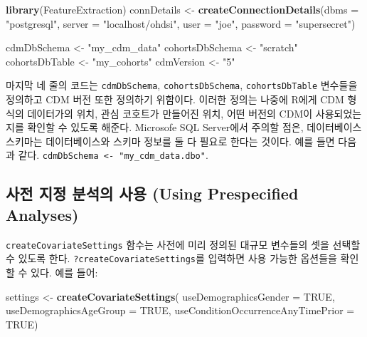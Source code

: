 \documentclass[11pt]{book}
\newenvironment{Shaded}{\begin{snugshade}}{\end{snugshade}}
\newcommand{\KeywordTok}[1]{\textcolor[rgb]{0.13,0.29,0.53}{\textbf{#1}}}
\newcommand{\DataTypeTok}[1]{\textcolor[rgb]{0.13,0.29,0.53}{#1}}
\newcommand{\StringTok}[1]{\textcolor[rgb]{0.31,0.60,0.02}{#1}}
\newcommand{\OtherTok}[1]{\textcolor[rgb]{0.56,0.35,0.01}{#1}}
\newcommand{\NormalTok}[1]{#1}
\theoremstyle{definition}
\theoremstyle{definition}
\theoremstyle{definition}
\theoremstyle{remark}
\begin{document}
\begin{Shaded}
\begin{Highlighting}[]
\KeywordTok{library}\NormalTok{(FeatureExtraction)}
\NormalTok{connDetails <-}\StringTok{ }\KeywordTok{createConnectionDetails}\NormalTok{(}\DataTypeTok{dbms =} \StringTok{"postgresql"}\NormalTok{,}
                                       \DataTypeTok{server =} \StringTok{"localhost/ohdsi"}\NormalTok{,}
                                       \DataTypeTok{user =} \StringTok{"joe"}\NormalTok{,}
                                       \DataTypeTok{password =} \StringTok{"supersecret"}\NormalTok{)}

\NormalTok{cdmDbSchema <-}\StringTok{ "my_cdm_data"}
\NormalTok{cohortsDbSchema <-}\StringTok{ "scratch"}
\NormalTok{cohortsDbTable <-}\StringTok{ "my_cohorts"}
\NormalTok{cdmVersion <-}\StringTok{ "5"}
\end{Highlighting}
\end{Shaded}

마지막 네 줄의 코드는 \texttt{cdmDbSchema}, \texttt{cohortsDbSchema},
\texttt{cohortsDbTable} 변수들을 정의하고 CDM 버전 또한 정의하기
위함이다. 이러한 정의는 나중에 R에게 CDM 형식의 데이터가의 위치, 관심
코호트가 만들어진 위치, 어떤 버전의 CDM이 사용되었는지를 확인할 수
있도록 해준다. Microsofe SQL Server에서 주의할 점은, 데이터베이스
스키마는 데이터베이스와 스키마 정보를 둘 다 필요로 한다는 것이다. 예를
들면 다음과 같다.
\texttt{cdmDbSchema\ \textless{}-\ "my\_cdm\_data.dbo"}.

\subsection{사전 지정 분석의 사용 (Using Prespecified
Analyses)}\label{----using-prespecified-analyses}

\texttt{createCovariateSettings} 함수는 사전에 미리 정의된 대규모
변수들의 셋을 선택할 수 있도록 한다. \texttt{?createCovariateSettings}를
입력하면 사용 가능한 옵션들을 확인할 수 있다. 예를 들어:

\begin{Shaded}
\begin{Highlighting}[]
\NormalTok{settings <-}\StringTok{ }\KeywordTok{createCovariateSettings}\NormalTok{(}
  \DataTypeTok{useDemographicsGender =} \OtherTok{TRUE}\NormalTok{, }
  \DataTypeTok{useDemographicsAgeGroup =} \OtherTok{TRUE}\NormalTok{, }
  \DataTypeTok{useConditionOccurrenceAnyTimePrior =} \OtherTok{TRUE}\NormalTok{) }
\end{Highlighting}
\end{Shaded}
\end{document}
